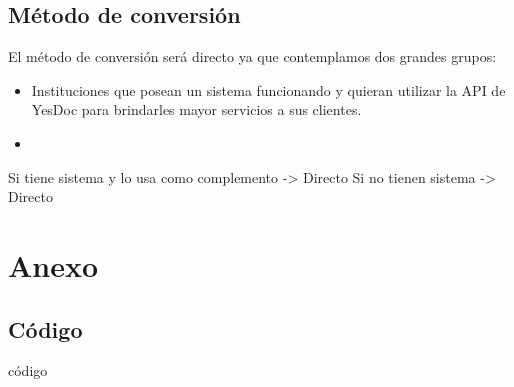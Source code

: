 \documentclass[a4paper,12pt]{article}
\begin{document}
\subsection{Método de conversión}
El método de conversión será directo ya que contemplamos dos grandes grupos:
\begin{itemize}
	\item Instituciones que posean un sistema funcionando y quieran utilizar la API de YesDoc para brindarles mayor servicios a sus clientes.
	\item
\end{itemize}
Si tiene sistema y lo usa como complemento -> Directo
Si no tienen sistema -> Directo

\newpage
\appendix 
\section{Anexo}
\subsection{Código} \label{codigo}
código



\printbibliography[
heading=bibintoc
]
\end{document}
